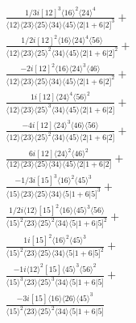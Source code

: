 \documentclass[varwidth, border=5pt]{standalone}
\begin{document}
\begin{my}
$\begin{gathered}
\scriptscriptstyle\frac{1/3i[12]^3\langle16\rangle^2\langle24\rangle^4}{\langle12\rangle\langle23\rangle\langle25\rangle\langle34\rangle\langle45\rangle\langle2|1+6|2]^3}+\\
\scriptscriptstyle\frac{1/2i[12]^2\langle16\rangle\langle24\rangle^4\langle56\rangle}{\langle12\rangle\langle23\rangle\langle25\rangle^2\langle34\rangle\langle45\rangle\langle2|1+6|2]^2}+\\
\scriptscriptstyle\frac{-2i[12]^2\langle16\rangle\langle24\rangle^3\langle46\rangle}{\langle12\rangle\langle23\rangle\langle25\rangle\langle34\rangle\langle45\rangle\langle2|1+6|2]^2}+\\
\scriptscriptstyle\frac{1i[12]\langle24\rangle^4\langle56\rangle^2}{\langle12\rangle\langle23\rangle\langle25\rangle^3\langle34\rangle\langle45\rangle\langle2|1+6|2]}+\\
\scriptscriptstyle\frac{-4i[12]\langle24\rangle^3\langle46\rangle\langle56\rangle}{\langle12\rangle\langle23\rangle\langle25\rangle^2\langle34\rangle\langle45\rangle\langle2|1+6|2]}+\\
\scriptscriptstyle\frac{6i[12]\langle24\rangle^2\langle46\rangle^2}{\langle12\rangle\langle23\rangle\langle25\rangle\langle34\rangle\langle45\rangle\langle2|1+6|2]}+\\
\scriptscriptstyle\frac{-1/3i[15]^3\langle16\rangle^2\langle45\rangle^3}{\langle15\rangle\langle23\rangle\langle25\rangle\langle34\rangle\langle5|1+6|5]^3}+\\
\scriptscriptstyle\frac{1/2i\langle12\rangle[15]^2\langle16\rangle\langle45\rangle^3\langle56\rangle}{\langle15\rangle^2\langle23\rangle\langle25\rangle^2\langle34\rangle\langle5|1+6|5]^2}+\\
\scriptscriptstyle\frac{1i[15]^2\langle16\rangle^2\langle45\rangle^3}{\langle15\rangle^2\langle23\rangle\langle25\rangle\langle34\rangle\langle5|1+6|5]^2}+\\
\scriptscriptstyle\frac{-1i\langle12\rangle^2[15]\langle45\rangle^3\langle56\rangle^2}{\langle15\rangle^3\langle23\rangle\langle25\rangle^3\langle34\rangle\langle5|1+6|5]}+\\
\scriptscriptstyle\frac{-3i[15]\langle16\rangle\langle26\rangle\langle45\rangle^3}{\langle15\rangle^2\langle23\rangle\langle25\rangle^2\langle34\rangle\langle5|1+6|5]}\phantom{+}
\end{gathered}$
\end{my}
\end{document}
